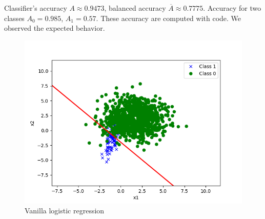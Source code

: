 
\begin{answer}
    Classifier's accuracy $A \approx 0.9473$, balanced accuracy $\overline{A} \approx 0.7775$.
    Accuracy for two classes $A_0 = 0.985$, $A_1 = 0.57$. These accuracy are computed with code.
    We observed the expected behavior.
    \begin{figure}[H]
        \centering
        \includegraphics[width=\textwidth]{../src/imbalanced/vanilla.png}
        \caption{Vanilla logistic regression}
        \label{fig:vanilla-sol}
    \end{figure}
\end{answer}